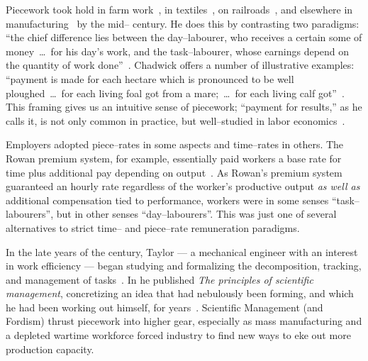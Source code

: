 \documentclass[pn4226]{subfiles}
\begin{document}
Piecework took hold in farm work~\cite{hughRaynbirdTaskWork}, %
in textiles~\cite{restructuringPieceworkBaker,riisOtherSideLives},
on railroads~\cite{Brown01041990}, and 
elsewhere in manufacturing~\cite{10.2307/3827491} by the mid-- century.
He does this by contrasting two paradigms:
``the chief difference lies between the day--labourer,
who receives a certain some of money~\dots~for his day's work,
and the task--labourer, whose earnings depend on the quantity of work done''~\cite{hughRaynbirdTaskWork}.
Chadwick offers a number of illustrative examples:
``payment is made for each hectare which is pronounced to be well ploughed~\dots~for each living foal got from a mare;~\dots~for each living calf got''~\cite{10.2307/2338394}.
This framing gives us an intuitive sense of piecework;
``payment for results,'' as he calls it,
is not only common in practice, but
well--studied in labor economics~\cite{Figlio2007901,weitzman1976new,10.2307/3003414,BJIR:BJIR038}.

Employers adopted piece--rates in some aspects and
time--rates in others.
The Rowan premium system, for example,
essentially paid workers
a base rate for time plus
additional pay depending on output~\cite{rowan1901premium}.
As Rowan's premium system guaranteed an hourly rate
regardless of the worker's productive output
\textit{as well as} additional compensation tied to performance,
workers were
in some senses ``task--labourers'', but
in other senses ``day--labourers''.
This was just one of several alternatives to strict time-- and piece--rate remuneration paradigms.

In the late years of the  century, Taylor
--- a mechanical engineer with an interest in work efficiency ---
began studying and formalizing the decomposition, tracking, and management of tasks~\cite{taylor1896piece}.
In \citeyear{taylor1914principles} he published \textit{The principles of scientific management},
concretizing an idea that had nebulously been forming,
and which he had been working out himself, for years~\cite{taylor1914principles}.
Scientific Management (and Fordism) thrust piecework into higher gear, especially as
mass manufacturing and
a depleted wartime workforce forced industry to find new ways to eke out more production capacity.
\end{document}
